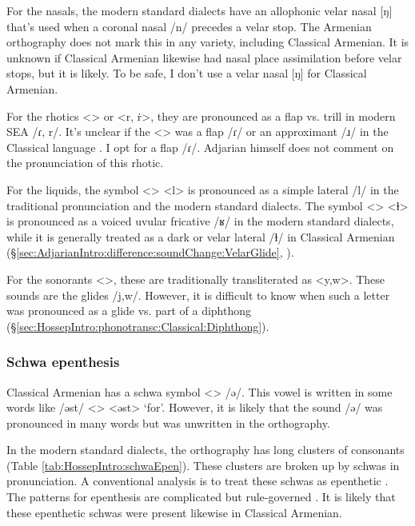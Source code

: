 For the nasals, the modern standard dialects have an allophonic velar nasal [ŋ] that's used when a coronal nasal /n/ precedes a velar stop. The Armenian orthography does not mark this in any variety, including Classical Armenian. It is unknown if Classical Armenian likewise had nasal place assimilation before velar stops, but it is likely. To be safe, I don't use a velar nasal [ŋ] for Classical Armenian. 

For the rhotics <> or <r, ṙ>, they are pronounced as a flap vs. trill in   modern SEA /ɾ, r/. It's unclear if the <> was a flap /ɾ/ or an approximant /ɹ/ in the Classical language \citep[1040]{Macak-2017-PhonoClassicalArmenian}. I opt for a flap /ɾ/. Adjarian himself does not comment on the pronunciation of this rhotic. 


For the liquids, the symbol <> <l> is pronounced as a simple lateral /l/ in the traditional pronunciation and the modern standard dialects. The symbol <> <ɫ> is pronounced as a voiced uvular fricative /ʁ/ in the modern standard dialects, while it is generally treated as a dark or velar lateral /ɫ/ in Classical Armenian (\S\ref{sec:AdjarianIntro:difference:soundChange:VelarGlide}, \citealt[ch2]{Macak-2016-StudiesClassicalModernArmenianPhono}).

For the sonorants <>, these are traditionally transliterated as <y,w>. These sounds are the glides /j,w/. However, it is difficult to know when such a letter was pronounced as a glide vs. part of a diphthong (\S\ref{sec:HossepIntro:phonotransc:Classical:Diphthong}). 

\subsubsection{Schwa epenthesis}\label{sec:HossepIntro:phonotransc:CA:schwa}


Classical Armenian has a schwa symbol <> /ə/. This vowel is written in some words like /əst/ <> <əst> `for'. However, it is likely that the sound /ə/ was pronounced in many words but was unwritten in the orthography. 

In the modern standard dialects, the orthography has long clusters of consonants (Table \ref{tab:HossepIntro:schwaEpen}). These clusters are broken up by schwas in pronunciation. A conventional analysis is to treat these schwas as epenthetic \citep{Vaux-1998-ArmenianPhono}. The patterns for epenthesis are complicated but rule-governed \citep[cf.][]{Dolatian-prep-Schwa}. It is likely that these epenthetic schwas were present likewise in Classical Armenian. 



